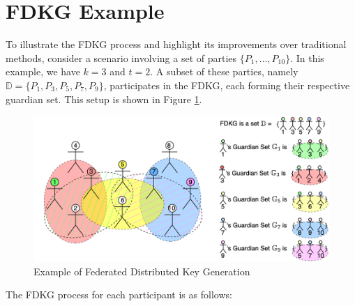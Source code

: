 \documentclass[runningheads]{llncs}
\begin{document}
\section{FDKG Example}

To illustrate the FDKG process and highlight its improvements over traditional methods, consider a scenario involving a set of parties $\{P_1, \ldots, P_{10}\}$. In this example, we have $k = 3$ and $t = 2$. A subset of these parties, namely $\mathbb{D} = \{P_1, P_3, P_5, P_7, P_9\}$, participates in the FDKG, each forming their respective guardian set. This setup is shown in Figure \ref{fig:FDKG}.

\begin{figure}
    \centering
    \includegraphics[width=.75\textwidth]{FDKG.png}
    \caption{Example of Federated Distributed Key Generation}
    \label{fig:FDKG}
\end{figure}

The FDKG process for each participant is as follows:
\end{document}
